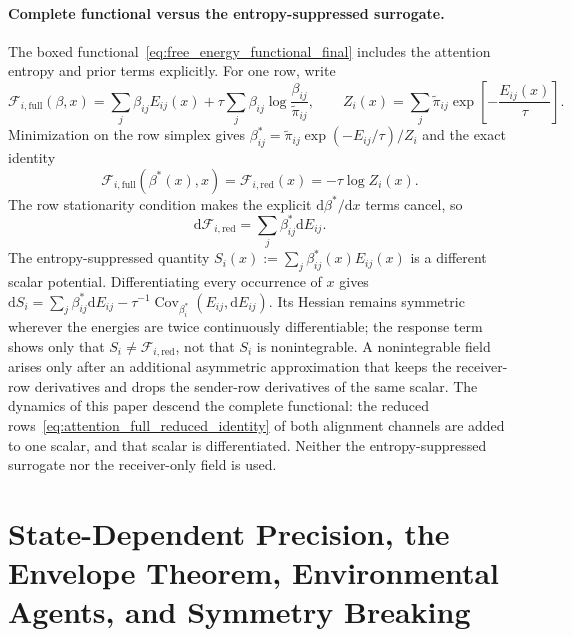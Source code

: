 \documentclass[11pt]{article}
\begin{document}
\paragraph{Complete functional versus the entropy-suppressed surrogate.}
The boxed functional~\eqref{eq:free_energy_functional_final} includes the attention entropy and prior terms explicitly. For one row, write
\begin{equation}
\mathcal{F}_{i,\mathrm{full}}(\beta,x)=\sum_j\beta_{ij}E_{ij}(x)+\tau\sum_j\beta_{ij}\log\frac{\beta_{ij}}{\tilde\pi_{ij}},
\qquad
Z_i(x)=\sum_j\tilde\pi_{ij}\exp\left[-\frac{E_{ij}(x)}{\tau}\right].
\label{eq:attention_full_reduced_identity}
\end{equation}
Minimization on the row simplex gives $\beta_{ij}^*=\tilde\pi_{ij}\exp(-E_{ij}/\tau)/Z_i$ and the exact identity
\begin{equation}
\mathcal{F}_{i,\mathrm{full}}(\beta^*(x),x)=\mathcal{F}_{i,\mathrm{red}}(x)=-\tau\log Z_i(x).
\label{eq:attention_full_equals_reduced}
\end{equation}
The row stationarity condition makes the explicit $\mathrm{d}\beta^*/\mathrm{d}x$ terms cancel, so
\begin{equation}
\mathrm{d}\mathcal{F}_{i,\mathrm{red}}=\sum_j\beta_{ij}^*\mathrm{d}E_{ij}.
\label{eq:attention_envelope_differential}
\end{equation}
The entropy-suppressed quantity $S_i(x):=\sum_j\beta_{ij}^*(x)E_{ij}(x)$ is a different scalar potential. Differentiating every occurrence of $x$ gives $\mathrm{d}S_i=\sum_j\beta_{ij}^*\mathrm{d}E_{ij}-\tau^{-1}\operatorname{Cov}_{\beta_i^*}(E_{ij},\mathrm{d}E_{ij})$. Its Hessian remains symmetric wherever the energies are twice continuously differentiable; the response term shows only that $S_i\neq\mathcal{F}_{i,\mathrm{red}}$, not that $S_i$ is nonintegrable. A nonintegrable field arises only after an additional asymmetric approximation that keeps the receiver-row derivatives and drops the sender-row derivatives of the same scalar. The dynamics of this paper descend the complete functional: the reduced rows~\eqref{eq:attention_full_reduced_identity} of both alignment channels are added to one scalar, and that scalar is differentiated. Neither the entropy-suppressed surrogate nor the receiver-only field is used.

\section{State-Dependent Precision, the Envelope Theorem, Environmental Agents, and Symmetry Breaking}\label{sec:precision_envelope}
\end{document}
